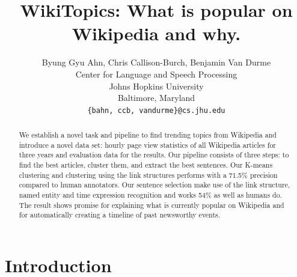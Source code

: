 \documentclass[11pt]{article}
\title{WikiTopics: What is popular on Wikipedia and why.}
\author{Byung Gyu Ahn, Chris Callison-Burch, Benjamin Van Durme \\
  Center for Language and Speech Processing \\
  Johns Hopkins University \\
  Baltimore, Maryland \\
  {\tt \{bahn, ccb, vandurme\}@cs.jhu.edu} \\}
\date{}
\begin{document}
\maketitle
\begin{abstract}
We establish a novel task and pipeline to find trending topics from Wikipedia and introduce a novel data set:
hourly page view statistics of all Wikipedia articles for three years and evaluation data for the results.
Our pipeline consists of three steps: to find the best articles, cluster them, and extract the best sentences.
Our K-means clustering and clustering using the link structures performs with a 71.5\% precision compared to human annotators.
Our sentence selection make use of the link structure, named entity and time expression recognition and works 54\% as well as humans do.  
The result shows promise for explaining what is currently popular on Wikipedia and for automatically creating a timeline of past newsworthy events.

\end{abstract}

\section{Introduction}






\end{document}
